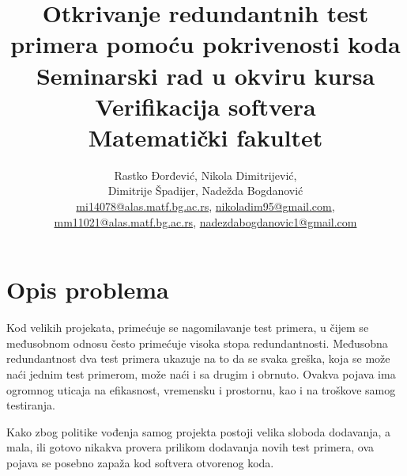 \documentclass[a4paper]{article}
\begin{document}
\title{Otkrivanje redundantnih test primera pomoću pokrivenosti koda\\ \small{Seminarski rad u okviru kursa Verifikacija softvera\\ Matematički fakultet}}

\author{Rastko Đorđević, Nikola Dimitrijević,\\
Dimitrije Špadijer, Nadežda Bogdanović\\
\href{mailto:mi14078@alas.matf.bg.ac.rs}{mi14078@alas.matf.bg.ac.rs}, \href{mailto:nikoladim95@gmail.com}{nikoladim95@gmail.com},\\ \href{mailto:mm11021@alas.matf.bg.ac.rs}{mm11021@alas.matf.bg.ac.rs}, 
\href{mailto:nadezdabodanovic1@gmail.com}{nadezdabogdanovic1@gmail.com}}


\maketitle


\tableofcontents

\newpage

\section{Opis problema}
\label{sec:opis_problema}

Kod velikih projekata, primećuje se nagomilavanje test primera, u čijem se međusobnom odnosu često primećuje visoka stopa redundantnosti. Međusobna redundantnost dva test primera ukazuje na to da se svaka greška, koja se može naći jednim test primerom, može naći i sa drugim i obrnuto.
Ovakva pojava ima ogromnog uticaja na efikasnost, vremensku i prostornu, kao i na troškove samog testiranja.

Kako zbog politike vođenja samog projekta postoji velika sloboda dodavanja, a mala, ili gotovo nikakva provera prilikom dodavanja novih test primera, ova pojava se posebno zapaža kod softvera otvorenog koda.
\end{document}
